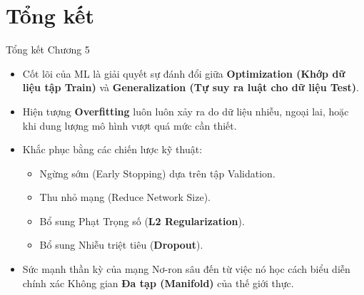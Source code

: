 \documentclass[aspectratio=169]{beamer}
\begin{document}
\section{Tổng kết}

\begin{frame}{Tổng kết Chương 5}
    \begin{itemize}
        \item Cốt lõi của ML là giải quyết sự đánh đổi giữa \textbf{Optimization (Khớp dữ liệu tập Train)} và \textbf{Generalization (Tự suy ra luật cho dữ liệu Test)}.
        \item Hiện tượng \textbf{Overfitting} luôn luôn xảy ra do dữ liệu nhiễu, ngoại lai, hoặc khi dung lượng mô hình vượt quá mức cần thiết.
        \item Khắc phục bằng các chiến lược kỹ thuật:
        \begin{itemize}
            \item Ngừng sớm (Early Stopping) dựa trên tập Validation.
            \item Thu nhỏ mạng (Reduce Network Size).
            \item Bổ sung Phạt Trọng số (\textbf{L2 Regularization}).
            \item Bổ sung Nhiễu triệt tiêu (\textbf{Dropout}).
        \end{itemize}
        \item Sức mạnh thần kỳ của mạng Nơ-ron sâu đến từ việc nó học cách biểu diễn chính xác Không gian \textbf{Đa tạp (Manifold)} của thế giới thực.
    \end{itemize}
\end{frame}
\end{document}
